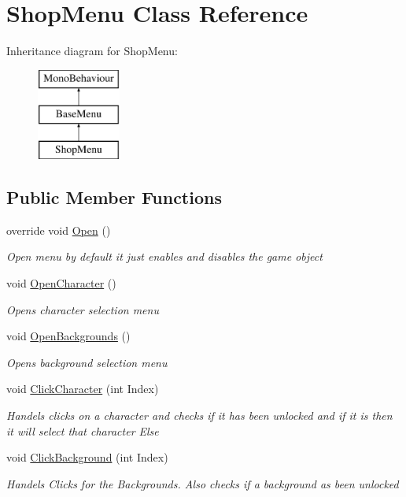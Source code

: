 \hypertarget{class_shop_menu}{}\section{Shop\+Menu Class Reference}
\label{class_shop_menu}
Inheritance diagram for Shop\+Menu\+:\begin{figure}[H]
\begin{center}
\leavevmode
\includegraphics[height=3.000000cm]{class_shop_menu}
\end{center}
\end{figure}
\subsection*{Public Member Functions}
\begin{DoxyCompactItemize}
\item 
override void \hyperlink{class_shop_menu_a5cc5d4f1fb5c029ed3d85a38db436ebd}{Open} ()
\begin{DoxyCompactList}\small\item\em Open menu by default it just enables and disables the game object \end{DoxyCompactList}\item 
void \hyperlink{class_shop_menu_a78cb7553d44f18e32666c47530d97bce}{Open\+Character} ()
\begin{DoxyCompactList}\small\item\em Opens character selection menu \end{DoxyCompactList}\item 
void \hyperlink{class_shop_menu_abb670c2e2a6300231f021b7ce432ef2d}{Open\+Backgrounds} ()
\begin{DoxyCompactList}\small\item\em Opens background selection menu \end{DoxyCompactList}\item 
void \hyperlink{class_shop_menu_a502b4b13c91c59f4f91415b0810b3069}{Click\+Character} (int Index)
\begin{DoxyCompactList}\small\item\em Handels clicks on a character and checks if it has been unlocked and if it is then it will select that character Else \end{DoxyCompactList}\item 
void \hyperlink{class_shop_menu_af3a1972edb54aa33a0fffa7f53ababa3}{Click\+Background} (int Index)
\begin{DoxyCompactList}\small\item\em Handels Clicks for the Backgrounds. Also checks if a background as been unlocked \end{DoxyCompactList}\end{DoxyCompactItemize}
